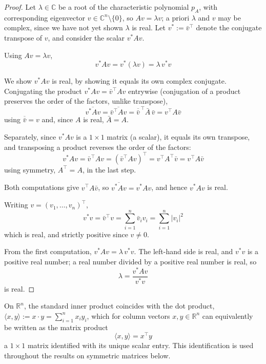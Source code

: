		\begin{proof}
			Let $\lambda \in \mathbb{C}$ be a root of the characteristic polynomial $p_A$, with corresponding eigenvector $v \in \mathbb{C}^n \setminus \{0\}$, so $Av = \lambda v$; a priori $\lambda$ and $v$ may be complex, since we have not yet shown $\lambda$ is real. Let $v^* := \bar{v}^\top$ denote the conjugate transpose of $v$, and consider the scalar $v^*Av$.
			
			Using $Av = \lambda v$,
			\[
				v^*Av = v^*(\lambda v) = \lambda\, v^*v
			\]
			
			We show $v^*Av$ is real, by showing it equals its own complex conjugate. Conjugating the product $v^*Av = \bar v^\top A v$ entrywise (conjugation of a product preserves the order of the factors, unlike transpose),
			\[
				\overline{v^*Av} = \overline{\bar v^\top A v} = \overline{\bar v}^{\,\top} \bar A\, \bar v = v^\top A \bar v
			\]
			using $\overline{\bar v} = v$ and, since $A$ is real, $\bar A = A$.
			
			Separately, since $v^*Av$ is a $1\times 1$ matrix (a scalar), it equals its own transpose, and transposing a product reverses the order of the factors:
			\[
				v^*Av = \bar v^\top A v = \left(\bar v^\top A v\right)^\top = v^\top A^\top \bar v = v^\top A \bar v
			\]
			using symmetry, $A^\top = A$, in the last step.
			
			Both computations give $v^\top A \bar v$, so $\overline{v^*Av} = v^*Av$, and hence $v^*Av$ is real.
			
			Writing $v = (v_1,\dots,v_n)^\top$,
			\[
				v^*v = \bar v^\top v = \sum_{i=1}^{n} \bar v_i v_i = \sum_{i=1}^{n} |v_i|^2
			\]
			which is real, and strictly positive since $v \neq 0$.
			
			From the first computation, $v^*Av = \lambda\, v^*v$. The left-hand side is real, and $v^*v$ is a positive real number; a real number divided by a positive real number is real, so
			\[
				\lambda = \frac{v^*Av}{v^*v}
			\]
			is real.
		\end{proof}
		
		\begin{remark}
			\label{rem:inner-product-as-matmul}
			On $\mathbb{R}^n$, the standard inner product coincides with the dot product, $\langle x,y \rangle := x \cdot y = \sum_{i=1}^n x_iy_i$, which for column vectors $x,y \in \mathbb{R}^n$ can equivalently be written as the matrix product
			\[
				\langle x,y \rangle = x^\top y
			\]
			a $1\times 1$ matrix identified with its unique scalar entry. This identification is used throughout the results on symmetric matrices below.
		\end{remark}
		
